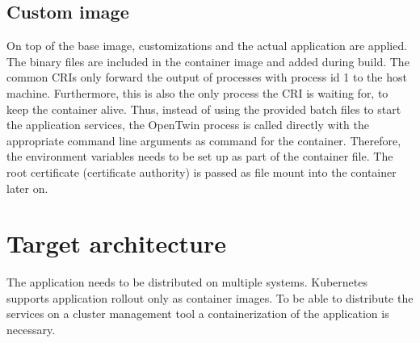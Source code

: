 \subsection{Custom image}
On top of the base image, customizations and the actual application are applied. The binary files are included in the container image and added during build. The common \acp{CRI} only forward the output of processes with process id 1 to the host machine. Furthermore, this is also the only process the  \ac{CRI} is waiting for, to keep the container alive. Thus, instead of using the provided batch files to start the application services, the OpenTwin process is called directly with the appropriate command line arguments as command for the container.
Therefore, the environment variables needs to be set up as part of the container file.
The root certificate (certificate authority) is passed as file mount into the container later on.


\section{Target architecture}
The application needs to be distributed on multiple systems. Kubernetes supports application rollout only as container images. To be able to distribute the services on a cluster management tool a containerization of the application is necessary.

